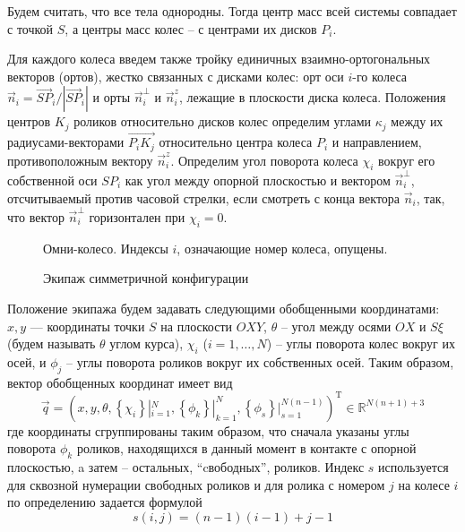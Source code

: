 Будем считать, что все тела однородны. Тогда центр масс всей системы совпадает с точкой $S$, а центры масс колес -- с центрами их дисков $P_i$.

Для каждого колеса введем также тройку единичных взаимно-ортогональных векторов (ортов), жестко связанных с дисками колес: орт оси $i$-го колеса $\vec{n}_i = \vec{SP}_i/|\vec{SP}_i|$ и орты $\vec{n}_i^\perp$ и $\vec{n}_i^z$, лежащие в плоскости диска колеса. Положения центров $K_j$ роликов относительно дисков колес определим углами $\kappa_j$ между их радиусами-векторами $\overrightarrow{P_iK_j}$ относительно центра колеса $P_i$ и направлением, противоположным вектору $\vec{n}_i^z$. Определим угол поворота колеса $\chi_i$ вокруг его собственной оси $SP_i$ как угол между опорной плоскостью и вектором $\vec{n}_i^\perp$, отсчитываемый против часовой стрелки, если смотреть с конца вектора $\vec{n}_i$, так, что вектор $\vec{n}_i^\perp$ горизонтален при $\chi_i = 0$.

\begin{center}
    \begin{figure}[h]
            \centering
            \caption{Омни-колесо. Индексы $i$, означающие номер колеса, опущены.}
            \label{fig:wheel}
        \endminipage
            \centering
            \caption{Экипаж симметричной конфигурации}
            \label{fig:vehicle}
        \endminipage
    \end{figure}
\end{center}

Положение экипажа будем задавать следующими обобщенными координатами:
$x, y$ --- координаты точки $S$ на плоскости $OXY$, $\theta$ -- угол между осями $OX$ и $S\xi$ (будем называть $\theta$ углом курса),
$\chi_i$ ($i = 1,\dots,N$) -- углы поворота колес вокруг их осей, и $\phi_j$ -- углы поворота роликов вокруг их собственных осей.
Таким образом, вектор обобщенных координат имеет вид
$$\vec{q} = (
    x, y, \theta,
    \left\{\chi_i\right\}|_{i=1}^N,
    \left\{\phi_k\right\}|_{k=1}^N,
    \left\{\phi_s\right\}|_{s=1}^{N(n - 1)}
)^{\mathop{T}}\in\mathbb{R}^{N(n+1) + 3}$$ 
где координаты сгруппированы таким образом, что сначала указаны углы поворота $\phi_k$ роликов, находящихся в данный момент в контакте с опорной плоскостью, a затем -- остальных, ``cвободных'', роликов. Индекс $s$ используется для сквозной нумерации свободных роликов и для ролика с номером $j$ на колесе $i$ по определению задается формулой
\begin{equation}\label{eq:num}
    s(i, j) = (n-1)(i-1) + j - 1
\end{equation}

